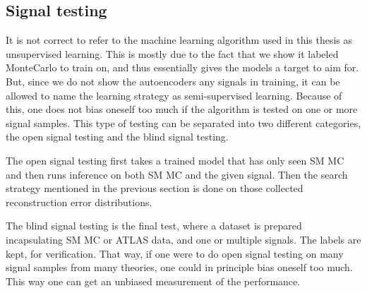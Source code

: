 \subsection*{Signal testing}
It is not correct to refer to the machine learning algorithm used in this thesis as unsupervised learning. 
This is mostly due to the fact that we show it labeled MonteCarlo to train on, and thus essentially gives 
the models a target to aim for. But, since we do not show the autoencoders any signals in training, it can be allowed to 
name the learning strategy as semi-supervised learning. Because of this, one does not bias oneself too much 
if the algorithm is tested on one or more signal samples. This type of testing can be separated into two
different categories, the open signal testing and the blind signal testing. \par 
The open signal testing first takes a trained model that has only seen SM MC and then runs inference on both 
SM MC and the given signal. Then the search strategy mentioned in the previous section is done on those 
collected reconstruction error distributions. \par 
The blind signal testing is the final test, where a dataset 
is prepared incapsulating SM MC or ATLAS data, and one or multiple signals. The labels are kept, for verification. 
That way, if one were to do open signal testing on many signal samples from many theories, one could 
in principle bias oneself too much. This way one can get an unbiased measurement of the performance. 